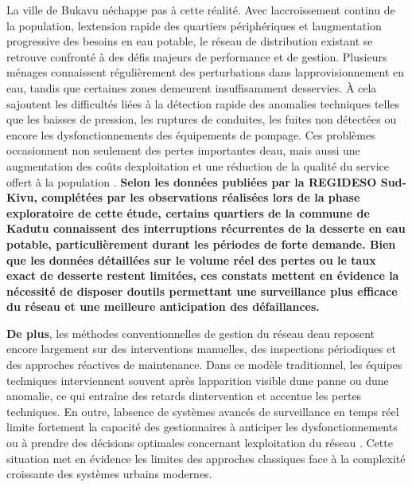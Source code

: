 \documentclass[12pt,a4paper,oneside]{report}
\begin{document}
La ville de Bukavu n\textquotesingle échappe pas à cette réalité. Avec
l\textquotesingle accroissement continu de la population,
l\textquotesingle extension rapide des quartiers périphériques et
l\textquotesingle augmentation progressive des besoins en eau potable,
le réseau de distribution existant se retrouve confronté à des défis
majeurs de performance et de gestion. Plusieurs ménages connaissent
régulièrement des perturbations dans l\textquotesingle approvisionnement
en eau, tandis que certaines zones demeurent insuffisamment desservies.
À cela s\textquotesingle ajoutent les difficultés liées à la détection
rapide des anomalies techniques telles que les baisses de pression, les
ruptures de conduites, les fuites non détectées ou encore les
dysfonctionnements des équipements de pompage. Ces problèmes
occasionnent non seulement des pertes importantes d\textquotesingle eau,
mais aussi une augmentation des coûts d\textquotesingle exploitation et
une réduction de la qualité du service offert à la population \cite{ref16}.
\textbf{Selon les données publiées par la REGIDESO Sud-Kivu, complétées
par les observations réalisées lors de la phase exploratoire de cette
étude, certains quartiers de la commune de Kadutu connaissent des
interruptions récurrentes de la desserte en eau potable,
particulièrement durant les périodes de forte demande. Bien que les
données détaillées sur le volume réel des pertes ou le taux exact de
desserte restent limitées, ces constats mettent en évidence la nécessité
de disposer d\textquotesingle outils permettant une surveillance plus
efficace du réseau et une meilleure anticipation des défaillances.}

\textbf{De plus}, les méthodes conventionnelles de gestion du réseau
d\textquotesingle eau reposent encore largement sur des interventions
manuelles, des inspections périodiques et des approches réactives de
maintenance. Dans ce modèle traditionnel, les équipes techniques
interviennent souvent après l\textquotesingle apparition visible
d\textquotesingle une panne ou d\textquotesingle une anomalie, ce qui
entraîne des retards d\textquotesingle intervention et accentue les
pertes techniques. En outre, l\textquotesingle absence de systèmes
avancés de surveillance en temps réel limite fortement la capacité des
gestionnaires à anticiper les dysfonctionnements ou à prendre des
décisions optimales concernant l\textquotesingle exploitation du réseau
\cite{ref6}. Cette situation met en évidence les limites des approches
classiques face à la complexité croissante des systèmes urbains
modernes.
\end{document}
